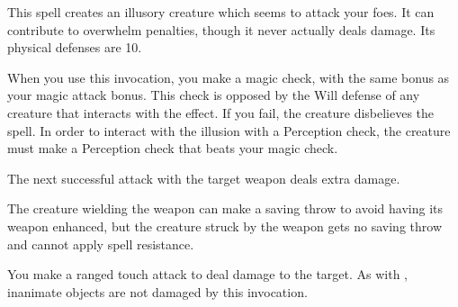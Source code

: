 \spellrng{\rngmed}
\begin{spelleffect}
    This spell creates an illusory creature which seems to attack your foes. It can contribute to overwhelm penalties, though it never actually deals damage. Its physical defenses are 10.
\end{spelleffect}
\begin{spellnotes}
    When you use this invocation, you make a magic check, with the same bonus as your magic attack bonus. This check is opposed by the Will defense of any creature that interacts with the effect. If you fail, the creature disbelieves the spell. In order to interact with the illusion with a Perception check, the creature must make a Perception check that beats your magic check.
\end{spellnotes}

\spellrng{\rngclose}
\begin{spelleffect}
The next successful attack with the target weapon deals extra damage.
\end{spelleffect}
\begin{spellnotes} 
    The creature wielding the weapon can make a saving throw to avoid having its weapon enhanced, but the creature struck by the weapon gets no saving throw and cannot apply spell resistance.
\end{spellnotes}

\spellrng{\rngclose}
\begin{spelleffect}
    You make a ranged touch attack to deal damage to the target. As with , inanimate objects are not damaged by this invocation.
\end{spelleffect}

